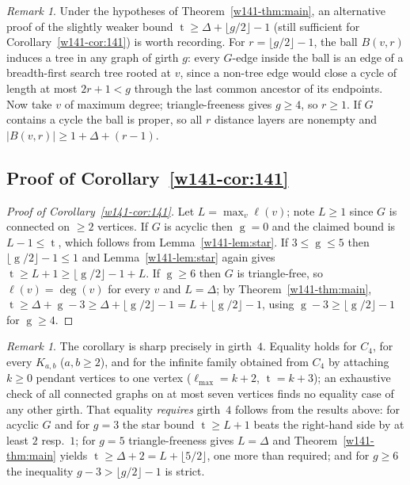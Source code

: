 \documentclass[11pt]{article}
\numberwithin{equation}{section}
\theoremstyle{remark}
\newtheorem{remark}[theorem]{Remark}
\newcommand{\tr}{\operatorname{t}}
\newcommand{\gr}{\operatorname{g}}
\newcommand{\lv}{\ell}
\begin{document}
\begin{remark}
Under the hypotheses of Theorem~\ref{w141-thm:main}, an alternative proof of the
slightly weaker bound $\tr\ge\Delta+\lfloor g/2\rfloor-1$ (still sufficient
for Corollary~\ref{w141-cor:141}) is worth recording.  For
$r=\lfloor g/2\rfloor-1$, the ball $B(v,r)$ induces a tree in any graph of
girth $g$: every $G$-edge inside the ball is an edge of a breadth-first
search tree rooted at $v$, since a non-tree edge would close a cycle of
length at most $2r+1<g$ through the last common ancestor of its endpoints.
Now take $v$ of maximum degree; triangle-freeness gives $g\ge4$, so
$r\ge1$.  If $G$ contains a cycle the ball is proper, so all $r$ distance
layers are nonempty and $|B(v,r)|\ge1+\Delta+(r-1)$.
\end{remark}

\subsection{Proof of Corollary~\texorpdfstring{\ref{w141-cor:141}}{1.2}}

\begin{proof}[Proof of Corollary~\ref{w141-cor:141}]
Let $L=\max_v\lv(v)$; note $L\ge1$ since $G$ is connected on $\ge2$
vertices.  If $G$ is acyclic then $\gr=0$ and the claimed bound is
$L-1\le\tr$, which follows from Lemma~\ref{w141-lem:star}.  If
$3\le\gr\le5$ then $\lfloor \gr/2\rfloor-1\le1$ and Lemma~\ref{w141-lem:star}
again gives $\tr\ge L+1\ge\lfloor \gr/2\rfloor-1+L$.  If $\gr\ge6$ then $G$
is triangle-free, so $\lv(v)=\deg(v)$ for every $v$ and $L=\Delta$; by
Theorem~\ref{w141-thm:main},
$\tr\ge\Delta+\gr-3\ge\Delta+\lfloor \gr/2\rfloor-1=L+\lfloor
\gr/2\rfloor-1$, using $\gr-3\ge\lfloor \gr/2\rfloor-1$ for $\gr\ge4$.
\end{proof}

\begin{remark}
The corollary is sharp precisely in girth~$4$.  Equality holds for $C_4$, for
every $K_{a,b}$ ($a,b\ge2$), and for the infinite family obtained from $C_4$
by attaching $k\ge0$ pendant vertices to one vertex ($\lv_{\max}=k+2$,
$\tr=k+3$); an exhaustive check of all connected graphs on at most seven
vertices finds no equality case of any other girth.  That equality
\emph{requires} girth~$4$ follows from the results above: for acyclic $G$
and for $g=3$ the star bound $\tr\ge L+1$ beats the right-hand side by at
least $2$ resp.\ $1$; for $g=5$ triangle-freeness gives $L=\Delta$ and
Theorem~\ref{w141-thm:main} yields $\tr\ge\Delta+2=L+\lfloor5/2\rfloor$, one more
than required; and for $g\ge6$ the inequality $g-3>\lfloor g/2\rfloor-1$ is
strict.
\end{remark}
\end{document}
